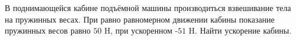 В поднимающейся кабине подъёмной машины производиться взвешивание тела на 
пружинных весах. При равно равномерном движении кабины показание 
пружинных весов равно $50$ H, при ускоренном -$51 $ H. Найти ускорение
кабины.
 
